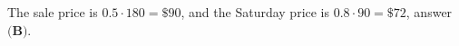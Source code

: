 The sale price is $0.5\cdot180=\$90$, and the Saturday price is $0.8\cdot90=\boxed{\$72}$, answer $\textbf{(B)}$.
